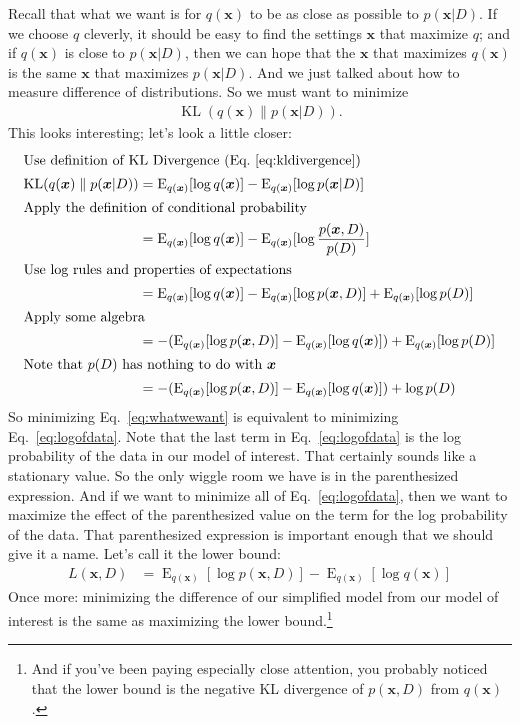 \documentclass[12pt]{article}
\newcommand{\KL}{\operatorname{KL}}
\newcommand{\E}{\operatorname{E}}
\begin{document}
Recall that what we want is for $q(\bm{x})$ to be as close as possible to
$p(\bm{x}|D)$.  If we choose $q$ cleverly, it should be easy to find the
settings $\bm{x}$ that maximize $q$; and if $q(\bm{x})$ is close to
$p(\bm{x}|D)$, then we can hope that the $\bm{x}$ that maximizes $q(\bm{x})$ is
the same $\bm{x}$ that maximizes $p(\bm{x}|D)$.  And we just talked about how to
measure difference of distributions.  So we must want to minimize
\begin{align}\label{eq:whatwewant}
    \KL(q(\bm{x})\parallel p(\bm{x}|D)).
\end{align}
This looks interesting; let's look a little closer:
\begin{align}
    \intertext{Use definition of KL Divergence (Eq.~\ref{eq:kldivergence})}
    \KL(q(\bm{x})\parallel p(\bm{x}|D))
    &= \E_{q(\bm{x})}[\log q(\bm{x})] - \E_{q(\bm{x})}[\log p(\bm{x}|D)]
    \nonumber \\
    \intertext{Apply the definition of conditional probability}
    &= \E_{q(\bm{x})}[\log q(\bm{x})] - \E_{q(\bm{x})}[\log
    \frac{p(\bm{x},D)}{p(D)}]
    \nonumber \\
    \intertext{Use log rules and properties of expectations}
    &= \E_{q(\bm{x})}[\log q(\bm{x})] - \E_{q(\bm{x})}[\log
    p(\bm{x},D)] + \E_{q(\bm{x})}[\log p(D)]
    \nonumber \\
    \intertext{Apply some algebra}
    &=  - (\E_{q(\bm{x})}[\log
    p(\bm{x},D)] - \E_{q(\bm{x})}[\log q(\bm{x})]) + \E_{q(\bm{x})}[\log p(D)]
    \nonumber \\
    \intertext{Note that $p(D)$ has nothing to do with $\bm{x}$}
    \label{eq:logofdata}
    &=  - (\E_{q(\bm{x})}[\log
    p(\bm{x},D)] - \E_{q(\bm{x})}[\log q(\bm{x})]) + \log p(D)
\end{align}
So minimizing Eq.~\ref{eq:whatwewant} is equivalent to minimizing
Eq.~\ref{eq:logofdata}.  Note that the last term in Eq.~\ref{eq:logofdata} is
the log probability of the data in our model of interest.  That certainly sounds
like a stationary value.  So the only wiggle room we have is in the
parenthesized expression.  And if we want to minimize all of
Eq.~\ref{eq:logofdata}, then we want to maximize the effect of the parenthesized
value on the term for the log probability of the data.  That parenthesized
expression is important enough that we should give it a name.  Let's call it the
lower bound:
\begin{align}\label{eq:lowerbound}
    L(\bm{x},D) &= \E_{q(\bm{x})}[\log p(\bm{x},D)]
    - \E_{q(\bm{x})}[\log q(\bm{x})]
\end{align}
Once more:  minimizing the difference of our simplified model from our model of
interest is the same as maximizing the lower bound.\footnote{And if you've been
paying especially close attention, you probably noticed that the lower bound is
the negative KL divergence of $p(\bm{x},D)$ from $q(\bm{x})$.}
\end{document}
